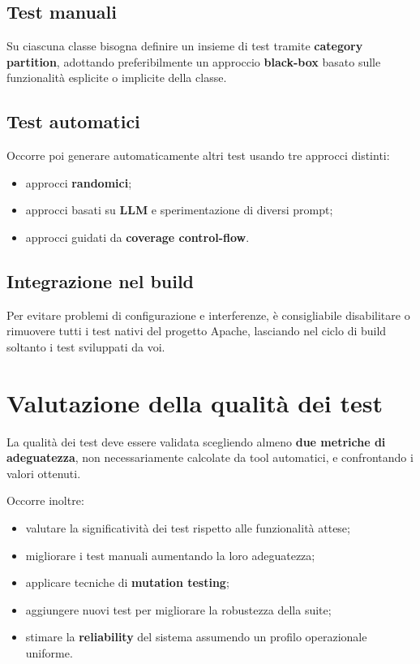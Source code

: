 \subsection{Test manuali}

Su ciascuna classe bisogna definire un insieme di test tramite \textbf{category partition}, adottando preferibilmente un approccio \textbf{black-box} basato sulle funzionalità esplicite o implicite della classe.

\subsection{Test automatici}

Occorre poi generare automaticamente altri test usando tre approcci distinti:
\begin{itemize}
    \item approcci \textbf{randomici};
    \item approcci basati su \textbf{LLM} e sperimentazione di diversi prompt;
    \item approcci guidati da \textbf{coverage control-flow}.
\end{itemize}

\subsection{Integrazione nel build}

\begin{notaprof}
Per evitare problemi di configurazione e interferenze, è consigliabile disabilitare o rimuovere tutti i test nativi del progetto Apache, lasciando nel ciclo di build soltanto i test sviluppati da voi.
\end{notaprof}

\section{Valutazione della qualità dei test}

La qualità dei test deve essere validata scegliendo almeno \textbf{due metriche di adeguatezza}, non necessariamente calcolate da tool automatici, e confrontando i valori ottenuti.

Occorre inoltre:
\begin{itemize}
    \item valutare la significatività dei test rispetto alle funzionalità attese;
    \item migliorare i test manuali aumentando la loro adeguatezza;
    \item applicare tecniche di \textbf{mutation testing};
    \item aggiungere nuovi test per migliorare la robustezza della suite;
    \item stimare la \textbf{reliability} del sistema assumendo un profilo operazionale uniforme.
\end{itemize}

